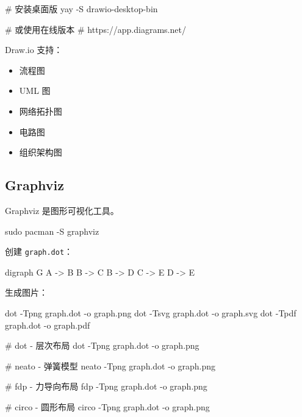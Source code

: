 \begin{lstcode}[numbers=none]
  # 安装桌面版
  yay -S drawio-desktop-bin

  # 或使用在线版本
  # https://app.diagrams.net/
\end{lstcode}

Draw.io 支持：

\begin{itemize}
  \item 流程图
  \item UML 图
  \item 网络拓扑图
  \item 电路图
  \item 组织架构图
\end{itemize}

\subsection{Graphviz}

Graphviz 是图形可视化工具。


\begin{lstcode}[numbers=none]
  sudo pacman -S graphviz
\end{lstcode}


创建 \lstinline{graph.dot}：

\begin{lstcode}[numbers=none]
digraph G {
    A -> B
    B -> C
    B -> D
    C -> E
    D -> E
}
\end{lstcode}

生成图片：

\begin{lstcode}[numbers=none]
  dot -Tpng graph.dot -o graph.png
  dot -Tsvg graph.dot -o graph.svg
  dot -Tpdf graph.dot -o graph.pdf
\end{lstcode}


\begin{lstcode}[numbers=none]
  # dot - 层次布局
  dot -Tpng graph.dot -o graph.png

  # neato - 弹簧模型
  neato -Tpng graph.dot -o graph.png

  # fdp - 力导向布局
  fdp -Tpng graph.dot -o graph.png

  # circo - 圆形布局
  circo -Tpng graph.dot -o graph.png
\end{lstcode}

